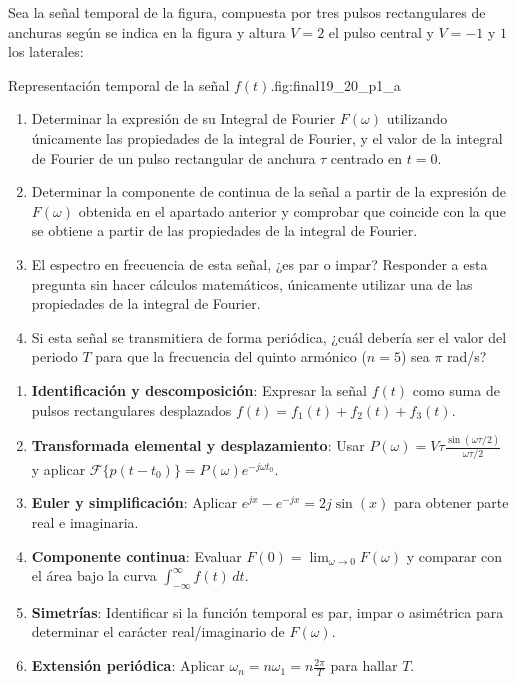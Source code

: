 \begin{problema}
Sea la señal temporal de la figura, compuesta por tres pulsos rectangulares de anchuras según se indica en la figura y altura $V=2$ el pulso central y $V=-1$ y $1$ los laterales:

%
       {Representación temporal de la señal $f(t)$.}{fig:final19_20_p1_a}

\begin{enumerate}[label=\alph*)]
    \item Determinar la expresión de su Integral de Fourier $F(\omega)$ utilizando únicamente las propiedades de la integral de Fourier, y el valor de la integral de Fourier de un pulso rectangular de anchura $\tau$ centrado en $t=0$.
    \item Determinar la componente de continua de la señal a partir de la expresión de $F(\omega)$ obtenida en el apartado anterior y comprobar que coincide con la que se obtiene a partir de las propiedades de la integral de Fourier.
    \item El espectro en frecuencia de esta señal, ¿es par o impar? Responder a esta pregunta sin hacer cálculos matemáticos, únicamente utilizar una de las propiedades de la integral de Fourier.
    \item Si esta señal se transmitiera de forma periódica, ¿cuál debería ser el valor del periodo $T$ para que la frecuencia del quinto armónico ($n=5$) sea $\pi$ rad/s?
\end{enumerate}
\end{problema}

\begin{mecanizado}
\begin{enumerate}
    \item \textbf{Identificación y descomposición}: Expresar la señal $f(t)$ como suma de pulsos rectangulares desplazados $f(t) = f_1(t) + f_2(t) + f_3(t)$.
    \item \textbf{Transformada elemental y desplazamiento}: Usar $P(\omega) = V \tau \frac{\sin(\omega\tau/2)}{\omega\tau/2}$ y aplicar $\mathcal{F}\{p(t - t_0)\} = P(\omega) e^{-j\omega t_0}$.
    \item \textbf{Euler y simplificación}: Aplicar $e^{jx} - e^{-jx} = 2j\sin(x)$ para obtener parte real e imaginaria.
    \item \textbf{Componente continua}: Evaluar $F(0) = \lim_{\omega \to 0} F(\omega)$ y comparar con el área bajo la curva $\int_{-\infty}^{\infty} f(t) \, dt$.
    \item \textbf{Simetrías}: Identificar si la función temporal es par, impar o asimétrica para determinar el carácter real/imaginario de $F(\omega)$.
    \item \textbf{Extensión periódica}: Aplicar $\omega_n = n \omega_1 = n \frac{2\pi}{T}$ para hallar $T$.
\end{enumerate}
\end{mecanizado}

